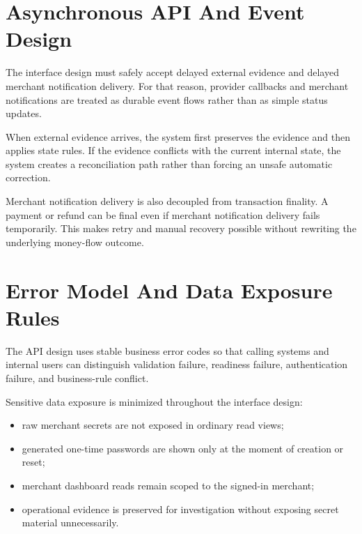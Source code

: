 \section{Asynchronous API And Event Design}

The interface design must safely accept delayed external evidence and delayed
merchant notification delivery. For that reason, provider callbacks and
merchant notifications are treated as durable event flows rather than as simple
status updates.

When external evidence arrives, the system first preserves the evidence and then
applies state rules. If the evidence conflicts with the current internal state,
the system creates a reconciliation path rather than forcing an unsafe
automatic correction.

Merchant notification delivery is also decoupled from transaction finality. A
payment or refund can be final even if merchant notification delivery fails
temporarily. This makes retry and manual recovery possible without rewriting the
underlying money-flow outcome.

\section{Error Model And Data Exposure Rules}

The API design uses stable business error codes so that calling systems and
internal users can distinguish validation failure, readiness failure,
authentication failure, and business-rule conflict.

Sensitive data exposure is minimized throughout the interface design:

\begin{itemize}
  \item raw merchant secrets are not exposed in ordinary read views;
  \item generated one-time passwords are shown only at the moment of creation
  or reset;
  \item merchant dashboard reads remain scoped to the signed-in merchant;
  \item operational evidence is preserved for investigation without exposing
  secret material unnecessarily.
\end{itemize}
